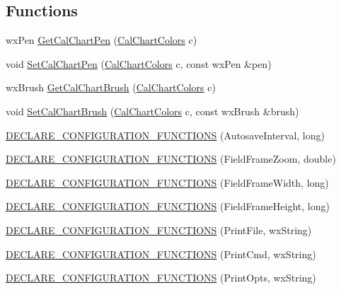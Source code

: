 \subsection*{Functions}
\begin{DoxyCompactItemize}
\item 
wx\-Pen \hyperlink{a00191_aedf2f07f030bd57f63a968808935a585}{Get\-Cal\-Chart\-Pen} (\hyperlink{a00191_a09f513be9cbd80355eda10ee8e4059e2}{Cal\-Chart\-Colors} c)
\item 
void \hyperlink{a00191_a0693ce4e33c0276aeece02b9d4bb77ff}{Set\-Cal\-Chart\-Pen} (\hyperlink{a00191_a09f513be9cbd80355eda10ee8e4059e2}{Cal\-Chart\-Colors} c, const wx\-Pen \&pen)
\item 
wx\-Brush \hyperlink{a00191_a553f7a0424cc3276b8bbf7195e567806}{Get\-Cal\-Chart\-Brush} (\hyperlink{a00191_a09f513be9cbd80355eda10ee8e4059e2}{Cal\-Chart\-Colors} c)
\item 
void \hyperlink{a00191_a582137aaac5b3c454db5608e60c3a0a8}{Set\-Cal\-Chart\-Brush} (\hyperlink{a00191_a09f513be9cbd80355eda10ee8e4059e2}{Cal\-Chart\-Colors} c, const wx\-Brush \&brush)
\item 
\hyperlink{a00191_a437999c7e8663fe3c96180d7b13f79f4}{D\-E\-C\-L\-A\-R\-E\-\_\-\-C\-O\-N\-F\-I\-G\-U\-R\-A\-T\-I\-O\-N\-\_\-\-F\-U\-N\-C\-T\-I\-O\-N\-S} (Autosave\-Interval, long)
\item 
\hyperlink{a00191_afcc2a8595a720b606e50369d0f082240}{D\-E\-C\-L\-A\-R\-E\-\_\-\-C\-O\-N\-F\-I\-G\-U\-R\-A\-T\-I\-O\-N\-\_\-\-F\-U\-N\-C\-T\-I\-O\-N\-S} (Field\-Frame\-Zoom, double)
\item 
\hyperlink{a00191_a8de1d6445944e3b356aea4728c32a6f3}{D\-E\-C\-L\-A\-R\-E\-\_\-\-C\-O\-N\-F\-I\-G\-U\-R\-A\-T\-I\-O\-N\-\_\-\-F\-U\-N\-C\-T\-I\-O\-N\-S} (Field\-Frame\-Width, long)
\item 
\hyperlink{a00191_af2ceec332bfdb2f7aff58eb66f353b89}{D\-E\-C\-L\-A\-R\-E\-\_\-\-C\-O\-N\-F\-I\-G\-U\-R\-A\-T\-I\-O\-N\-\_\-\-F\-U\-N\-C\-T\-I\-O\-N\-S} (Field\-Frame\-Height, long)
\item 
\hyperlink{a00191_a54f1db559a212e0c9cf49512d5fd1663}{D\-E\-C\-L\-A\-R\-E\-\_\-\-C\-O\-N\-F\-I\-G\-U\-R\-A\-T\-I\-O\-N\-\_\-\-F\-U\-N\-C\-T\-I\-O\-N\-S} (Print\-File, wx\-String)
\item 
\hyperlink{a00191_a5f05238c4898ed228a08f8b13afa8c52}{D\-E\-C\-L\-A\-R\-E\-\_\-\-C\-O\-N\-F\-I\-G\-U\-R\-A\-T\-I\-O\-N\-\_\-\-F\-U\-N\-C\-T\-I\-O\-N\-S} (Print\-Cmd, wx\-String)
\item 
\hyperlink{a00191_a3e727a5f4eeb0035d08ef996f1c894dd}{D\-E\-C\-L\-A\-R\-E\-\_\-\-C\-O\-N\-F\-I\-G\-U\-R\-A\-T\-I\-O\-N\-\_\-\-F\-U\-N\-C\-T\-I\-O\-N\-S} (Print\-Opts, wx\-String)

\end{DoxyCompactItemize}
